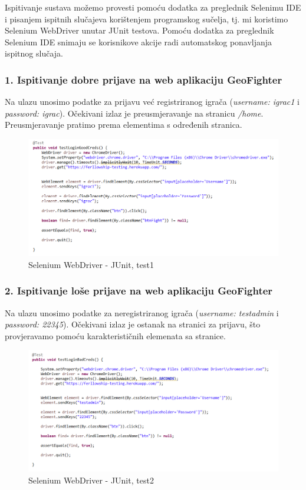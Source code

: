 			{Ispitivanje sustava možemo provesti pomoću dodatka za preglednik Selenimu IDE i pisanjem ispitnih slučajeva korištenjem programskog sučelja, tj. mi koristimo Selenium WebDriver unutar JUnit testova. Pomoću dodatka za preglednik Selenium IDE snimaju se korisnikove akcije radi automatskog ponavljanja ispitnog slučaja.} 
			
			\subsubsection	{1. Ispitivanje dobre prijave na web aplikaciju GeoFighter }
			
				{Na ulazu unosimo podatke za prijavu već registriranog igrača (\emph{username: igrac1} i \emph{password: igrac}). Očekivani izlaz je preusmjeravanje na stranicu \emph{/home}. Preusmjeravanje pratimo prema elementima s određenih stranica. }
				
					\begin{figure}[H]
					\includegraphics[width=\textwidth]{slike/JUSeTest1} 
					\centering
					\caption{Selenium WebDriver - JUnit, test1}
					\label{}
					\end{figure}
				
			\subsubsection{2. Ispitivanje loše prijave na web aplikaciju GeoFighter}
			
				{Na ulazu unosimo podatke za neregistriranog igrača (\emph{username: testadmin} i \emph{password: 22345}). Očekivani izlaz je ostanak na stranici za prijavu, što provjeravamo pomoću karakterističnih elemenata sa stranice.}
			
					\begin{figure}[H]
						\includegraphics[width=\textwidth]{slike/JUSeTest2} 
						\centering
						\caption{Selenium WebDriver - JUnit, test2}
						\label{}
					\end{figure}
			
